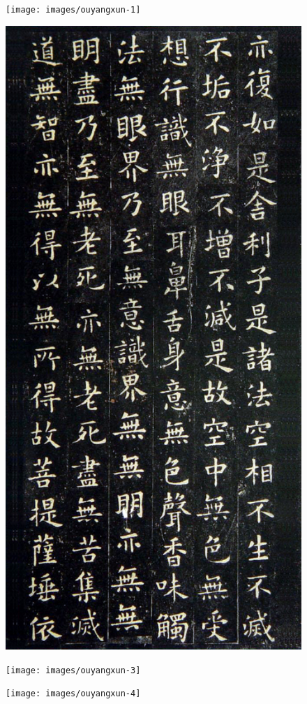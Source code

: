 \documentclass[a4paper,twoside]{article}
\begin{document}
\begin{figure}[ht]
\centering
\texttt{[image: images/ouyangxun-1]}
\end{figure}
\begin{figure}[ht]
\centering
\includegraphics[width=11.6cm]{images/ouyangxun-2}
\end{figure}
\begin{figure}[ht]
\centering
\texttt{[image: images/ouyangxun-3]}
\end{figure}
\begin{figure}[ht]
\centering
\texttt{[image: images/ouyangxun-4]}
\end{figure}
\cleardoublepage
\end{document}
